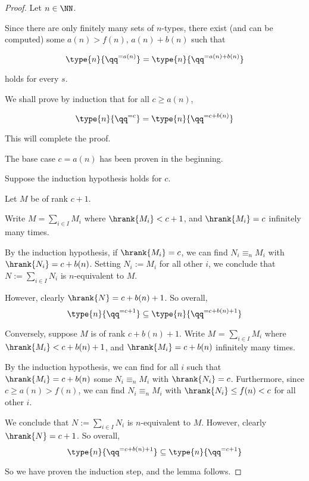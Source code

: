 \begin{proof}
  Let $n \in \NN$.

  Since there are only finitely many sets of $n$-types,
  there exist (and can be computed)
  some $a(n) > f(n)$, $a(n) + b(n)$ such that

  \[\type{n}{\qq^{= a(n)}} = \type{n}{\qq^{= a(n) + b(n)}}\]

  holds for every $s$.

  We shall prove by induction that for all $c \ge a(n)$,

  \[\type{n}{\qq^{= c}} = \type{n}{\qq^{= c + b(n)}}\]

  This will complete the proof.

  The base case $c = a(n)$ has been proven in the beginning.

  Suppose the induction hypothesis holds for $c$.

  Let $M$ be of rank $c + 1$.

  Write $M = \sum_{i \in I} M_i$ where $\hrank{M_i} < c + 1$,
  and $\hrank{M_i} = c$ infinitely many times.

  By the induction hypothesis,
  if $\hrank{M_i} = c$, we can find $N_i \equiv_n M_i$ with $\hrank{N_i} = c + b(n)$.
  Setting $N_i := M_i$ for all other $i$, we conclude that $N := \sum_{i \in I} N_i$
  is $n$-equivalent to $M$.

  However, clearly $\hrank{N} = c + b(n) + 1$. So overall,
  \[\type{n}{\qq^{= c + 1}} \subseteq \type{n}{\qq^{= c + b(n) + 1}}\]

  Conversely, suppose $M$ is of rank $c + b(n) + 1$.
  Write $M$ = $\sum_{i \in I} M_i$ where $\hrank{M_i} < c + b(n) + 1$,
  and $\hrank{M_i} = c + b(n)$ infinitely many times.

  By the induction hypothesis,
  we can find for all $i$ such that $\hrank{M_i} = c + b(n)$ some
  $N_i \equiv_n M_i$ with $\hrank{N_i} = c$.
  Furthermore, since $c \ge a(n) > f(n)$, we can
  find $N_i \equiv_n M_i$ with $\hrank{N_i} \le f(n) < c$ for all other $i$.

  We conclude that $N := \sum_{i \in I} N_i$ is $n$-equivalent to $M$.
  However, clearly $\hrank{N} = c + 1$. So overall,
  \[\type{n}{\qq^{= c + b(n) + 1}} \subseteq \type{n}{\qq^{= c + 1}}\]

  So we have proven the induction step, and the lemma follows.
\end{proof}

